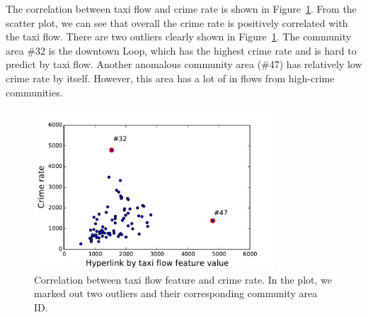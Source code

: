 The correlation between taxi flow and crime rate is shown in Figure~\ref{fig:taxi-corr}. From the scatter plot, we can see that overall the crime rate is positively correlated with the taxi flow. There are two  outliers clearly shown in Figure~\ref{fig:taxi-corr}. The community area \#32 is the downtown Loop, which has the highest crime rate and is hard to predict by taxi flow. Another anomalous community area (\#47) has relatively low crime rate by itself. However, this area has a lot of in flows from high-crime communities. 




\begin{figure}[ht]
\centering
\includegraphics[width=0.8\textwidth]{fig/taxi-flow-percent.pdf}
\caption{Correlation between taxi flow feature and crime rate. In the plot, we marked out two outliers and their corresponding community area ID.}
\label{fig:taxi-corr}
\end{figure}




